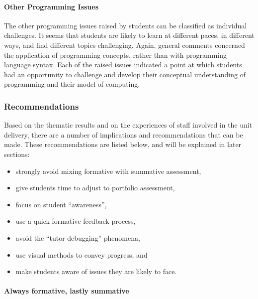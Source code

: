 
\paragraph{Other Programming Issues} %
\label{ssub:other_programming_issues}

The other programming issues raised by students can be classified as individual challenges. It seems that students are likely to learn at different paces, in different ways, and find different topics challenging. Again, general comments concerned the application of programming concepts, rather than with programming language syntax. Each of the raised issues indicated a point at which students had an opportunity to challenge and develop their conceptual understanding of programming and their model of computing. 


\subsubsection{Recommendations}
 
Based on the thematic results and on the experiences of staff involved in the unit delivery, there are a number of implications and recommendations that can be made. These recommendations are listed below, and will be explained in later sections:

\begin{itemize}[noitemsep,nolistsep]
	\item strongly avoid mixing formative with summative assessment,
	\item give students time to adjust to portfolio assessment, 
	\item focus on student ``awareness'',
	\item use a quick formative feedback process, 
	\item avoid the ``tutor debugging'' phenomena,  
	\item use visual methods to convey progress, and  
	\item make students aware of issues they are likely to face.
\end{itemize}

\paragraph{Always formative, lastly summative}

